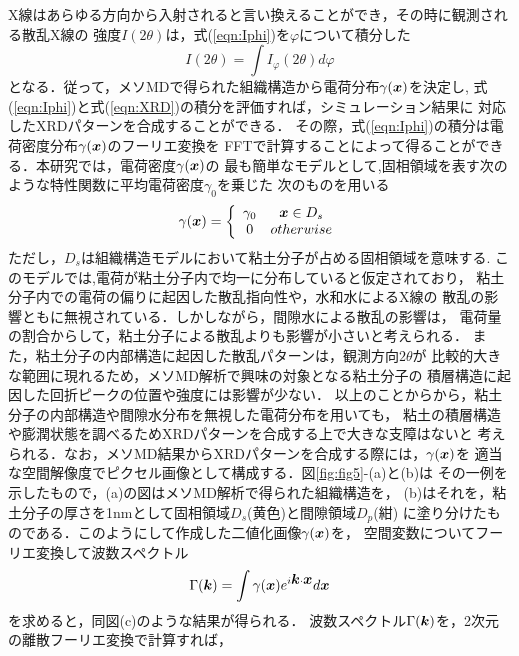X線はあらゆる方向から入射されると言い換えることができ，その時に観測される散乱X線の
強度$I(2\theta)$は，式(\ref{eqn:Iphi})を$\varphi$について積分した
\begin{equation}
	I(2\theta)=\int I_{\varphi}(2\theta) d\varphi
	\label{eqn:XRD}
\end{equation}
となる．従って，メソMDで得られた組織構造から電荷分布$\gamma(\mbox{\boldmath $x$})$を決定し,
式(\ref{eqn:Iphi})と式(\ref{eqn:XRD})の積分を評価すれば，シミュレーション結果に
対応したXRDパターンを合成することができる．
その際，式(\ref{eqn:Iphi})の積分は電荷密度分布$\gamma(\mbox{\boldmath $x$})$のフーリエ変換を
FFTで計算することによって得ることができる．本研究では，電荷密度$\gamma(\mbox{\boldmath $x$})$の
最も簡単なモデルとして,固相領域を表す次のような特性関数に平均電荷密度$\gamma_0$を乗じた
次のものを用いる
\begin{equation}
	\gamma(\mbox{\boldmath $x$})=\left\{
		\begin{array}{cc}
		\gamma_0 &  \mbox{\boldmath $x$} \in D_s \\
			0 &  otherwise
		\end{array}
	\right.
	\label{eqn:gamma}
\end{equation}
ただし，$D_s$は組織構造モデルにおいて粘土分子が占める固相領域を意味する.
このモデルでは,電荷が粘土分子内で均一に分布していると仮定されており，
粘土分子内での電荷の偏りに起因した散乱指向性や，水和水によるX線の
散乱の影響ともに無視されている．しかしながら，間隙水による散乱の影響は，
電荷量の割合からして，粘土分子による散乱よりも影響が小さいと考えられる．
また，粘土分子の内部構造に起因した散乱パターンは，観測方向$2\theta$が
比較的大きな範囲に現れるため，メソMD解析で興味の対象となる粘土分子の
積層構造に起因した回折ピークの位置や強度には影響が少ない．
以上のことからから，粘土分子の内部構造や間隙水分布を無視した電荷分布を用いても，
粘土の積層構造や膨潤状態を調べるためXRDパターンを合成する上で大きな支障はないと
考えられる．なお，メソMD結果からXRDパターンを合成する際には，$\gamma(\mbox{\boldmath $x$})$を
適当な空間解像度でピクセル画像として構成する．図\ref{fig:fig5}-(a)と(b)は
その一例を示したもので，(a)の図はメソMD解析で得られた組織構造を，
(b)はそれを，粘土分子の厚さを1nmとして固相領域$D_s$(黄色)と間隙領域$D_p$(紺)
に塗り分けたものである．このようにして作成した二値化画像$\gamma(\mbox{\boldmath $x$})$を，
空間変数についてフーリエ変換して波数スペクトル
\begin{equation}
	\Gamma(\mbox{\boldmath $k$})=\int \gamma(\mbox{\boldmath $x$}) e^{i\mbox{\boldmath $k$}\cdot\mbox{\boldmath $x$}} d\mbox{\boldmath $x$}
	\label{eqn:Gamma}
\end{equation}
を求めると，同図(c)のような結果が得られる．
波数スペクトル$\Gamma(\mbox{\boldmath $k$})$を，2次元の離散フーリエ変換で計算すれば，
